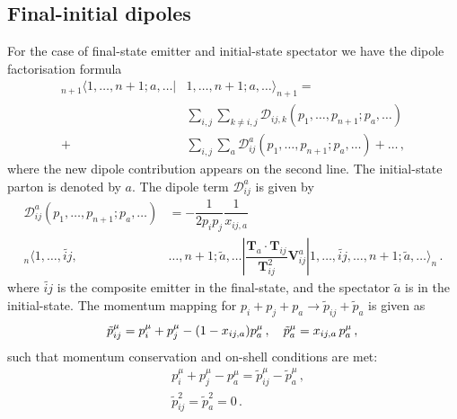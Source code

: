 \documentclass[main.tex]{subfiles}
\begin{document}
    \subsection{Final-initial dipoles}
        For the case of final-state emitter and initial-state
        spectator we have the dipole factorisation formula
        \begin{equation}\label{eqn:FI_factorisation}
            \begin{split}
                {}_{n+1}\langle 1, \ldots, n+1; a, \ldots |& 1, \ldots, n+1; a, \ldots \rangle_{n+1} = \\
                &\sum_{i,j}\sum_{k\neq i,j} \mathcal{D}_{ij,k}(p_{1},\ldots,p_{n+1};p_{a},\ldots) \\
                + &\sum_{i,j}\sum_{a} \mathcal{D}_{ij}^{a}(p_{1},\ldots,p_{n+1};p_{a},\ldots) + \ldots \, ,
            \end{split}
        \end{equation}
        where the new dipole contribution appears on the second line.
        The initial-state parton is denoted by $a$.
        The dipole term $\mathcal{D}_{ij}^{a}$ is given by
        \begin{equation}\label{eqn:D_aij}
            \begin{split}
                \mathcal{D}_{ij}^{a}(p_{1}, \ldots, p_{n+1}; p_{a}, \ldots) &= -\dfrac{1}{2p_{i}p_{j}} \dfrac{1}{x_{ij,a}} \\
                {}_{n} \langle 1, \ldots, \widetilde{ij}, &\ldots, n+1; \tilde{a}, \ldots | \dfrac{\boldsymbol{T}_{a} \cdot \boldsymbol{T}_{ij}}{\boldsymbol{T}_{ij}^{2}} \boldsymbol{V}_{ij}^{a} | 1, \ldots, \widetilde{ij}, \ldots, n+1; \tilde{a} , \ldots \rangle_{n} \, .
            \end{split}
        \end{equation}
        where $\widetilde{ij}$ is the composite emitter in the
        final-state, and the spectator $\tilde{a}$ is in the initial-state.
        The momentum mapping for $p_{i} + p_{j} + p_{a} \rightarrow \tilde{p}_{ij} + \tilde{p}_{a}$ is given as
        \begin{equation}\label{eqn:FI_mapping}
            \tilde{p}_{ij}^{\mu} = p_{i}^{\mu} + p_{j}^{\mu} - (1-x_{ij,a})p_{a}^{\mu} \, , \quad \tilde{p}_{a}^{\mu} = x_{ij,a} \, p_{a}^{\mu} \, , \\
        \end{equation}
        such that momentum conservation and on-shell conditions are met:
        \begin{equation}\label{eqn:FI_mapping_conditions}
            \begin{split}
                &p_{i}^{\mu} + p_{j}^{\mu} - p_{a}^{\mu} = \tilde{p}_{ij}^{\mu} - \tilde{p}_{a}^{\mu} \, , \\
                &\tilde{p}_{ij}^{2} = \tilde{p}_{a}^{2} = 0 \, .
            \end{split}
        \end{equation}
\end{document}
